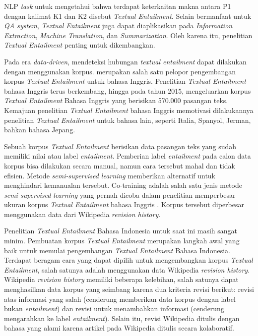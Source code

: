 NLP \textit{task} untuk mengetahui bahwa terdapat keterkaitan makna antara P1 dengan kalimat K1 dan K2 disebut \textit{Textual Entailment}. Selain bermanfaat untuk \textit{QA system}, \textit{Textual Entailment} juga dapat diaplikasikan pada \textit{Information Extraction}, \textit{Machine Translation}, dan \textit{Summarization}. Oleh karena itu, penelitian \textit{Textual Entailment} penting untuk dikembangkan.

Pada era \textit{data-driven}, mendeteksi hubungan \textit{textual entailment} dapat dilakukan dengan menggunakan korpus. \cite{dagan2005} merupakan salah satu pelopor pengembangan korpus \textit{Textual Entailment} untuk bahasa Inggris. Penelitian \textit{Textual Entailment} bahasa Inggris terus berkembang, hingga pada tahun 2015, \cite{snli:emnlp2015} mengeluarkan korpus \textit{Textual Entailment} Bahasa Inggris yang berisikan 570.000 pasangan teks. Kemajuan penelitian \textit{Textual Entailment} bahasa Inggris memotivasi dilakukannya penelitian \textit{Textual Entailment} untuk bahasa lain, seperti Italia, Spanyol, Jerman, bahkan bahasa Jepang. 

Sebuah korpus \textit{Textual Entailment} berisikan data pasangan teks yang sudah memiliki nilai atau label \textit{entailment}. Pemberian label \textit{entailment} pada calon data korpus bisa dilakukan secara manual, namun cara tersebut mahal dan tidak efisien. Metode \textit{semi-supervised learning} memberikan alternatif untuk menghindari kemanualan tersebut. Co-training adalah salah satu jenis metode \textit{semi-supervised learning} yang pernah dicoba dalam penelitian memperbesar ukuran korpus \textit{Textual Entailment} bahasa Inggris \citep{zanzottoRTEexpand}. Korpus tersebut diperbesar menggunakan data dari Wikipedia \textit{revision history}. 

Penelitian \textit{Textual Entailment} Bahasa Indonesia untuk saat ini masih sangat minim. Pembuatan korpus \textit{Textual Entailment} merupakan langkah awal yang baik untuk memulai pengembangan \textit{Textual Entailment} Bahasa Indonesia. Terdapat beragam cara yang dapat dipilih untuk mengembangkan korpus \textit{Textual Entailment}, salah satunya adalah menggunakan data Wikipedia \textit{revision history}. Wikipedia \textit{revision history} memiliki beberapa kelebihan, salah satunya dapat menghasilkan data korpus yang seimbang karena dua kriteria revisi berikut: revisi atas informasi yang salah (cenderung memberikan data korpus dengan label bukan \textit{entailment}) dan revisi untuk menambahkan informasi (cenderung mengarahkan ke label \textit{entailment}). Selain itu, revisi Wikipedia ditulis dengan bahasa yang alami karena artikel pada Wikipedia ditulis secara kolaboratif. 

